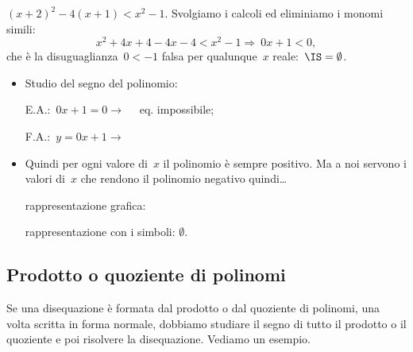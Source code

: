 \begin{esempio}{}{}
\((x+2)^2-4(x+1)<x^{2}-1.\)
Svolgiamo i calcoli ed eliminiamo i monomi simili:
\[x^{2}+4x+4-4x-4<x^{2}-1\Rightarrow~0 x + 1 < 0,\]
che è la disuguaglianza~\(0<-1\) falsa per qualunque~\(x\) 
reale:~\(\IS=\emptyset \).
\begin{itemize} [noitemsep]
 \item Studio del segno del polinomio:\\
 \begin{minipage}{.45\textwidth}
  E.A.:~\(0 x + 1 = 0  \rightarrow \quad \) eq. impossibile;
 \end{minipage}
 \begin{minipage}{.25\textwidth}
  F.A.:~\(y=0 x + 1 \rightarrow \)
 \end{minipage}
 \begin{minipage}{.3\textwidth}
%   
  \segnipos
 \end{minipage}
 \item Quindi per ogni valore di~\(x\) il polinomio è sempre positivo. 
  Ma a noi servono i valori di~\(x\) che rendono il polinomio negativo 
  quindi\dots
 \subitem 
  \begin{minipage}{.35\textwidth}
   rappresentazione grafica: 
  \end{minipage}
  \begin{minipage}{.30\textwidth}
%    
  \end{minipage}
 \subitem rappresentazione con i simboli: \quad \(\emptyset\). 
\end{itemize}
\end{esempio}

\subsection{Prodotto o quoziente di polinomi}
\label{sec:dis_prod_quo}

Se una disequazione è formata dal prodotto o dal quoziente di polinomi, 
una volta scritta in forma normale,
dobbiamo studiare il segno di tutto il prodotto o il quoziente e poi risolvere
la disequazione.
Vediamo un esempio.

